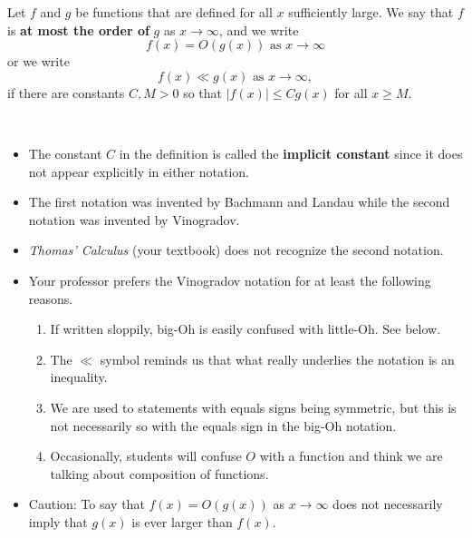 \begin{definition}
Let $f$ and $g$ be functions that are defined for all $x$ sufficiently large.
We say that $f$ is \textbf{at most the order of} $g$ as $x\to \infty$, and we write
\begin{equation*}
f(x) = O(g(x)) \text{ as } x\to \infty
\end{equation*}
or we write
\begin{equation*}
f(x)\ll g(x) \text{ as } x\to \infty,
\end{equation*}
if there are constants $C, M>0$ so that $|f(x)|\le C g(x)$ for all $x\ge M$.
\end{definition}
\begin{remark}\,
\begin{itemize}
\item The constant $C$ in the definition is called the \textbf{implicit constant} since it does not appear explicitly in either notation.
\item The first notation was invented by Bachmann and Landau while the second notation was invented by Vinogradov.
\item \textit{Thomas' Calculus} (your textbook) does not recognize the second notation.
\item Your professor prefers the Vinogradov notation for at least the following reasons.
\begin{enumerate}
\item If written sloppily, big-Oh is easily confused with little-Oh.  See below.
\item The $\ll$ symbol reminds us that what really underlies the notation is an inequality.
\item We are used to statements with equals signs being symmetric, but this is not necessarily so with the equals sign in the big-Oh notation.
\item Occasionally, students will confuse $O$ with a function and think we are talking about composition of functions.
\end{enumerate}
\item Caution: To say that $f(x) = O(g(x))$ as $x\to \infty$ does not necessarily imply that $g(x)$ is ever larger than $f(x)$.
\end{itemize}
\end{remark}

\newpage

